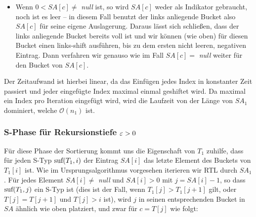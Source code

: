 \begin{itemize}
\item Wenn $ 0 < SA[c] \neq$ \textit{null} ist, so wird $SA[c]$ weder als Indikator gebraucht, noch ist es leer -- in diesem Fall benutzt der links anliegende Bucket also $SA[c]$ für seine eigene Auslagerung. Daraus lässt sich schließen, dass der links anliegende Bucket bereits voll ist und wir können (wie oben) für diesen Bucket einen links-shift ausführen, bis zu dem ersten nicht leeren, negativen Eintrag. Dann verfahren wir genauso wie im Fall $SA[c] = $ \textit{null} weiter für den Bucket von $SA[c]$.
\end{itemize}

Der Zeitaufwand ist hierbei linear, da das Einfügen jedes Index in konstanter Zeit passiert und jeder eingefügte Index maximal einmal geshiftet wird. Da maximal ein Index pro Iteration eingefügt wird, wird die Laufzeit von der Länge von $SA_1$ dominiert, welche $\mathcal O(n_1)$ ist.

\subsubsection{ S-Phase für Rekursionstiefe $\varepsilon > 0$}

Für diese Phase der Sortierung kommt uns die Eigenschaft von $T_1$ zuhilfe, dass für jeden S-Typ $\text{suf}(T_1, i)$ der Eintrag $SA[i]$ das letzte Element des Buckets von $T_1[i]$ ist. Wie im Ursprungsalgorithmus vorgesehen iterieren wir RTL durch $SA_1$. Für jedes Element $SA[i] \neq $ \textit{null} und $SA[i] > 0$ mit $j = SA[i] -1$, so dass $\text{suf}(T_1,j)$ ein S-Typ ist (dies ist der Fall, wenn $T_1[j] > T_1[j+1]$ gilt, oder $T[j] = T[j+1]$ und $T[j] > i$ ist), wird $j$ in seinen entsprechenden Bucket in $SA$ ähnlich wie oben platziert, und zwar für $c = T[j]$ wie folgt:

